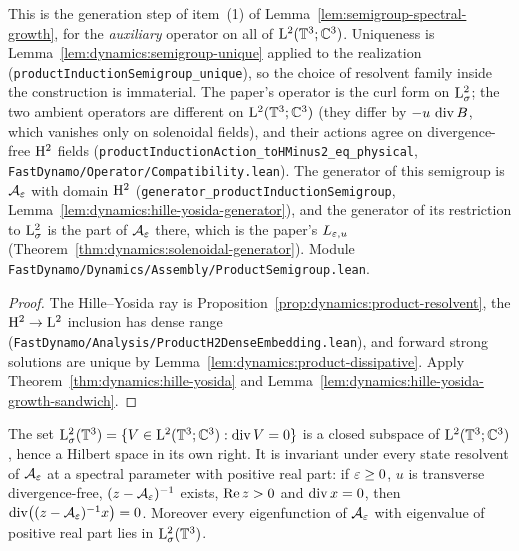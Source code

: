 This is the generation step of item~(1) of Lemma~\ref{lem:semigroup-spectral-growth}, for the
\emph{auxiliary} operator on all of $\mathrm{L}^2(\mathbb{T}^3;\mathbb{C}^3)$.  Uniqueness is
Lemma~\ref{lem:dynamics:semigroup-unique} applied to the realization
(\texttt{productInductionSemigroup\_unique}), so the choice of resolvent family inside the
construction is immaterial.  The paper's operator is the curl form on $\mathrm{L}^2_\sigma$; the two
ambient operators are different on $\mathrm{L}^2(\mathbb{T}^3;\mathbb{C}^3)$ (they differ by $-u\,\operatorname{div} B $, which
vanishes only on solenoidal fields), and their actions agree on divergence-free $\mathrm{H}^2 $
fields (\texttt{productInductionAction\_toHMinus2\_eq\_physical},
\texttt{FastDynamo/Operator/Compatibility.lean}).  The generator of this semigroup is
$\mathcal A_\varepsilon$ with domain $\mathrm{H}^2$ (\texttt{generator\_productInductionSemigroup},
Lemma~\ref{lem:dynamics:hille-yosida-generator}), and the generator of its restriction to
$\mathrm{L}^2_\sigma$ is the part of $\mathcal A_\varepsilon$ there, which is the paper's $L_{\varepsilon,u}$
(Theorem~\ref{thm:dynamics:solenoidal-generator}).  Module
\texttt{FastDynamo/Dynamics/Assembly/ProductSemigroup.lean}.

\begin{proof}
  \leanok
  The Hille--Yosida ray is Proposition~\ref{prop:dynamics:product-resolvent}, the
  $\mathrm{H}^2\to\mathrm{L}^2 $ inclusion has dense range
  (\texttt{FastDynamo/Analysis/ProductH2DenseEmbedding.lean}), and forward strong solutions
  are unique by Lemma~\ref{lem:dynamics:product-dissipative}.  Apply
  Theorem~\ref{thm:dynamics:hille-yosida} and
  Lemma~\ref{lem:dynamics:hille-yosida-growth-sandwich}.
\end{proof}

\begin{lemma}
  \label{lem:dynamics:solenoidal-subspace}
  \leanok
  The set $\mathrm{L}^2_\sigma(\mathbb{T}^3)=\{V\in\mathrm{L}^2(\mathbb{T}^3;\mathbb{C}^3):\operatorname{div} V=0\} $ is a closed subspace of
  $\mathrm{L}^2(\mathbb{T}^3;\mathbb{C}^3) $, hence a Hilbert space in its own right.  It is invariant under every
  state resolvent of $\mathcal A_\varepsilon $ at a spectral parameter with positive real part: if
  $\varepsilon\geq0 $, $u $ is transverse divergence-free, $(z-\mathcal A_\varepsilon)^{-1} $ exists,
  $\operatorname{Re} z>0 $ and $\operatorname{div} x=0 $, then $\operatorname{div}\bigl((z-\mathcal A_\varepsilon)^{-1}x\bigr)=0 $.  Moreover
  every eigenfunction of $\mathcal A_\varepsilon $ with eigenvalue of positive real part lies in
  $\mathrm{L}^2_\sigma(\mathbb{T}^3) $.
\end{lemma}

